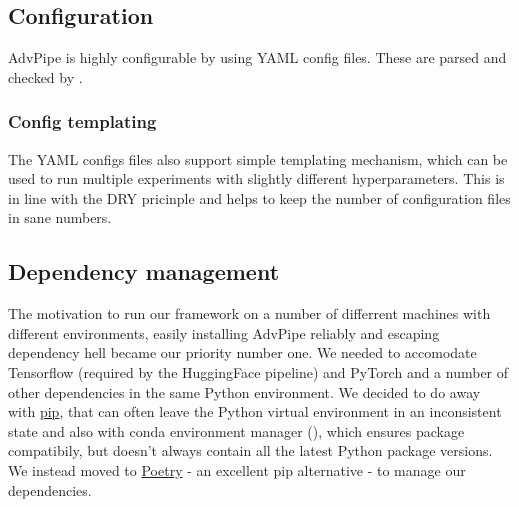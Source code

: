 \subsection{Configuration}
AdvPipe is highly configurable by using YAML config files. These are parsed and checked by .


\subsubsection{Config templating}
The YAML configs files also support simple templating mechanism, which can be used to run multiple experiments with slightly different hyperparameters. This is in line with the DRY pricinple and helps to keep the number of configuration files in sane numbers.

\subsection{Dependency management}
The motivation to run our framework on a number of differrent machines with different environments, easily installing AdvPipe reliably and escaping dependency hell became our priority number one. We needed to accomodate Tensorflow (required by the HuggingFace pipeline) and PyTorch and a number of other dependencies in the same Python environment. We decided to do away with \href{https://pip.pypa.io/en/stable/}{pip}, that can often leave the Python virtual environment in an inconsistent state and also with conda environment manager (\cite{anaconda}), which ensures package compatibily, but doesn't always contain all the latest Python package versions. We instead moved to \href{https://python-poetry.org/}{Poetry} - an excellent pip alternative - to manage our dependencies.
